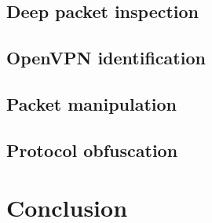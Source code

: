 \documentclass[12pt, fleqn, a4paper]{article}
\begin{document}
\subsection{Deep packet inspection}
\subsection{OpenVPN identification}
\subsection{Packet manipulation}
\subsection{Protocol obfuscation}
\section*{\centering Conclusion}

% 
\end{document}
